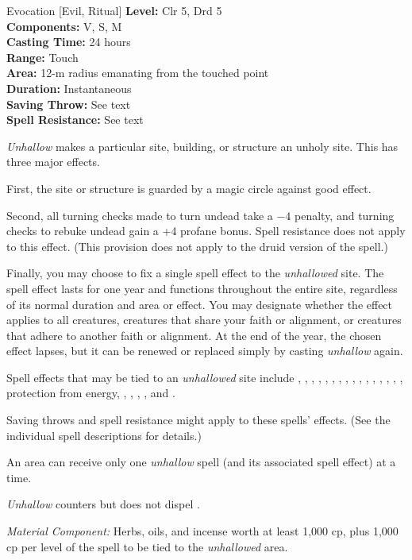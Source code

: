 {Evocation [Evil, Ritual]}
{
	\textbf{Level:}
	Clr 5, Drd 5\\
	\textbf{Components:}
	V, S, M\\
	\textbf{Casting Time:}
	24 hours\\
	\textbf{Range:}
	Touch\\
	\textbf{Area:}
	12-m radius emanating from the touched point\\
	\textbf{Duration:}
	Instantaneous\\
	\textbf{Saving Throw:}
	See text\\
	\textbf{Spell Resistance:}
	See text\\
}
{
	\emph{Unhallow} makes a particular site, building, or structure an unholy site. This has three major effects.

	First, the site or structure is guarded by a magic circle against good effect.

	Second, all turning checks made to turn undead take a $-4$ penalty, and turning checks to rebuke undead gain a +4 profane bonus. Spell resistance does not apply to this effect. (This provision does not apply to the druid version of the spell.)

	Finally, you may choose to fix a single spell effect to the \emph{unhallowed} site. The spell effect lasts for one year and functions throughout the entire site, regardless of its normal duration and area or effect. You may designate whether the effect applies to all creatures, creatures that share your faith or alignment, or creatures that adhere to another faith or alignment. At the end of the year, the chosen effect lapses, but it can be renewed or replaced simply by casting \emph{unhallow} again.

	Spell effects that may be tied to an \emph{unhallowed} site include , , , , , , , , , , , , , , , , protection from energy, , , , , and .

Saving throws and spell resistance might apply to these spells' effects. (See the individual spell descriptions for details.)

	An area can receive only one \emph{unhallow} spell (and its associated spell effect) at a time.

	\emph{Unhallow} counters but does not dispel .

	\textit{Material Component:}
	Herbs, oils, and incense worth at least 1,000 cp, plus 1,000 cp per level of the spell to be tied to the \emph{unhallowed} area.

}
